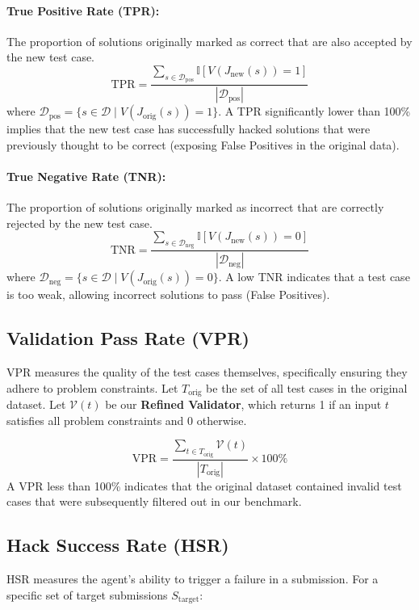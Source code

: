 \documentclass[11pt]{article}
\begin{document}
\paragraph{True Positive Rate (TPR):} The proportion of solutions originally marked as correct that are also accepted by the new test case.
\[
\text{TPR} = \frac{\sum_{s \in \mathcal{D}_{\text{pos}}} \mathbb{I}[V(J_{\text{new}}(s)) = 1]}{|\mathcal{D}_{\text{pos}}|}
\]
where $\mathcal{D}_{\text{pos}} = \{s \in \mathcal{D} \mid V(J_{\text{orig}}(s)) = 1\}$. A TPR significantly lower than 100\% implies that the new test case has successfully hacked solutions that were previously thought to be correct (exposing False Positives in the original data).

\paragraph{True Negative Rate (TNR):} The proportion of solutions originally marked as incorrect that are correctly rejected by the new test case.
\[
\text{TNR} = \frac{\sum_{s \in \mathcal{D}_{\text{neg}}} \mathbb{I}[V(J_{\text{new}}(s)) = 0]}{|\mathcal{D}_{\text{neg}}|}
\]
where $\mathcal{D}_{\text{neg}} = \{s \in \mathcal{D} \mid V(J_{\text{orig}}(s)) = 0\}$. A low TNR indicates that a test case is too weak, allowing incorrect solutions to pass (False Positives).

\subsection{Validation Pass Rate (VPR)}
VPR measures the quality of the test cases themselves, specifically ensuring they adhere to problem constraints.
Let $T_{\text{orig}}$ be the set of all test cases in the original dataset. Let $\mathcal{V}(t)$ be our \textbf{Refined Validator}, which returns 1 if an input $t$ satisfies all problem constraints and 0 otherwise.

\[
\text{VPR} = \frac{\sum_{t \in T_{\text{orig}}} \mathcal{V}(t)}{|T_{\text{orig}}|} \times 100\%
\]
A VPR less than 100\% indicates that the original dataset contained invalid test cases that were subsequently filtered out in our benchmark.

\subsection{Hack Success Rate (HSR)}
HSR measures the agent's ability to trigger a failure in a submission. For a specific set of target submissions $S_{\text{target}}$:
\end{document}
